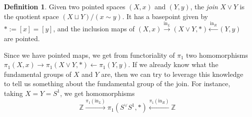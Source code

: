 \documentclass{tufte-handout}
\def\ZZ{\mathbb{Z}}
\theoremstyle{definition}
\newtheorem{definition}{Definition}
\begin{document}
\begin{definition}
Given two pointed spaces $(X,x)$ and $(Y,y)$, the \emph{join} $X\vee Y$ is the quotient 
space $(X\sqcup Y)/(x\sim y)$. It has a basepoint given by $*:=[x] = [y]$, and the 
inclusion maps of $(X,x)\xrightarrow{\mathrm{in}_L} (X\vee Y,*) \xleftarrow{\mathrm{in}_R} (Y,y)$ are pointed.
\end{definition}



Since we have pointed maps, we get from functoriality of $\pi_1$ two 
homomorphisms $\pi_1(X,x) \to \pi_1(X\vee Y,*) \leftarrow \pi_1(Y,y)$. 
If we already know what the fundamental groups of $X$ and $Y$ are, then we 
can try to leverage this knowledge to tell us something about the fundamental group
of the join. For instance, taking $X = Y = S^1$, we get homomorphisms 
\[
\ZZ \xrightarrow{\pi_1(\mathrm{in}_L)} \pi_1(S^\vee S^1,\ast) \xleftarrow{\pi_1(\mathrm{in}_R)} \ZZ
\]
\end{document}
